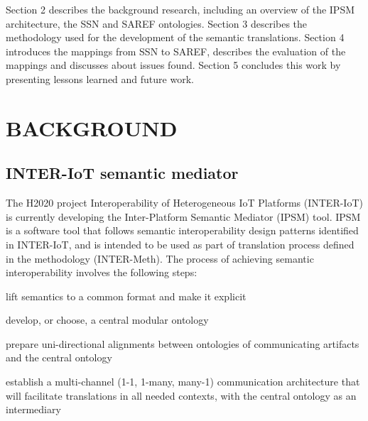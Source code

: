 \documentclass{sig-alternate-05-2015}
\begin{document}
Section 2 describes the background research, including an overview of the IPSM architecture, the SSN and SAREF ontologies. Section 3 describes the methodology used for the development of the semantic translations. Section 4 introduces the mappings from SSN to SAREF, describes the evaluation of the mappings and discusses about issues found. Section 5 concludes this work by presenting lessons learned and future work. 

\section{BACKGROUND}

\subsection{INTER-IoT semantic mediator}
The H2020 project Interoperability of Heterogeneous IoT Platforms (INTER-IoT) \cite{Ganzha2016,Ganzha2017a} is currently developing the  Inter-Platform Semantic Mediator (IPSM) tool. IPSM is a software tool that follows semantic interoperability design patterns identified in INTER-IoT, and is intended to be used as part of translation process defined in the methodology (INTER-Meth). The process of achieving semantic interoperability involves the following steps:

\begin{enumerate*}[label=\roman*)]
	\item lift semantics to a common format and make it explicit \cite{Ganzha2017a}
	\item develop, or choose, a central modular ontology
	\item prepare uni-directional alignments between ontologies of communicating artifacts and the central ontology
	\item establish a multi-channel (1-1, 1-many, many-1) communication architecture that will facilitate translations in all needed contexts, with the central ontology as an intermediary
\end{enumerate*}

\end{document}
